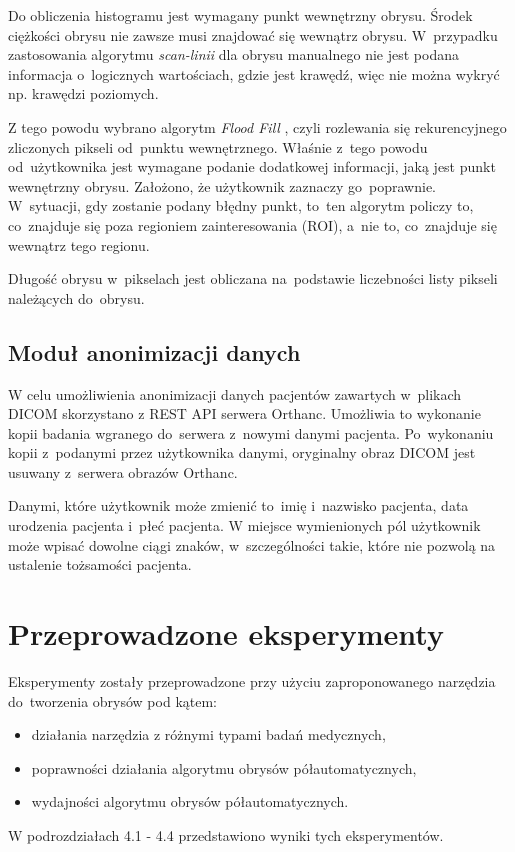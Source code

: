 \documentclass[a4paper,11pt,twoside,openright]{report}
\newcommand\blankpage{%
    \null
    \thispagestyle{empty}%
    \newpage}
\theoremstyle{definition}
\begin{document}
Do obliczenia histogramu jest wymagany punkt wewnętrzny obrysu. Środek ciężkości
obrysu nie zawsze musi znajdować się wewnątrz obrysu. W~przypadku zastosowania
algorytmu \textit{scan-linii} \cite{GK1} dla obrysu manualnego nie jest podana informacja o~logicznych
wartościach, gdzie jest krawędź, więc nie można wykryć np. krawędzi poziomych.

Z tego powodu wybrano algorytm \textit{Flood Fill} \cite{AiSD2}, czyli rozlewania się rekurencyjnego %
zliczonych pikseli od~punktu wewnętrznego. Właśnie z~tego powodu od~użytkownika
jest wymagane podanie dodatkowej informacji, jaką jest punkt wewnętrzny obrysu.
Założono, że użytkownik zaznaczy go~poprawnie. W~sytuacji, gdy zostanie podany
błędny punkt, to~ten algorytm policzy to, co~znajduje się poza regioniem zainteresowania (ROI),
a~nie to, co~znajduje się wewnątrz tego regionu.

Długość obrysu w~pikselach jest obliczana na~podstawie liczebności listy pikseli należących do~obrysu.

\section {Moduł anonimizacji danych}

W celu umożliwienia anonimizacji danych pacjentów zawartych w~plikach DICOM skorzystano
z REST API serwera Orthanc. Umożliwia to wykonanie kopii badania wgranego do~serwera
z~nowymi danymi pacjenta. Po~wykonaniu kopii z~podanymi przez użytkownika danymi,
oryginalny obraz DICOM jest usuwany z~serwera obrazów Orthanc.

Danymi, które użytkownik może zmienić to~imię i~nazwisko pacjenta, data urodzenia pacjenta
i~płeć pacjenta. W miejsce wymienionych pól użytkownik może wpisać dowolne ciągi
znaków, w~szczególności takie, które nie pozwolą na ustalenie tożsamości pacjenta.

\afterpage{\blankpage}

\chapter {Przeprowadzone eksperymenty}

Eksperymenty zostały przeprowadzone przy użyciu zaproponowanego narzędzia 
do~tworzenia obrysów pod kątem:
\begin{itemize}[noitemsep]
\item działania narzędzia z różnymi typami badań medycznych,
\item poprawności działania algorytmu obrysów półautomatycznych,
\item wydajności algorytmu obrysów półautomatycznych.
\end{itemize}
W podrozdziałach 4.1 - 4.4 przedstawiono wyniki tych eksperymentów.
\end{document}
